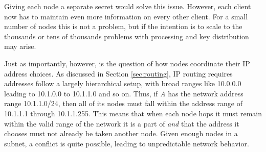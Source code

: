 \par Giving each node a separate secret would solve this issue. However, each client now has to maintain even more information on every other client. For a small number of nodes this is not a problem, but if the intention is to scale to the thousands or tens of thousands problems with processing and key distribution may arise.  

\par Just as importantly, however, is the question of how nodes coordinate their IP address choices. As discussed in Section \ref{sec:routing}, IP routing requires addresses follow a largely hierarchical setup, with broad ranges like 10.0.0.0 leading to 10.1.0.0 to 10.1.1.0 and so on. Thus, if \textit{A} has the network address range 10.1.1.0/24, then all of its nodes must fall within the address range of 10.1.1.1 through 10.1.1.255. This means that when each node hops it must remain within the valid range of the network it is a part of \textit{and} that the address it chooses must not already be taken another node. Given enough nodes in a subnet, a conflict is quite possible, leading to unpredictable network behavior. 



